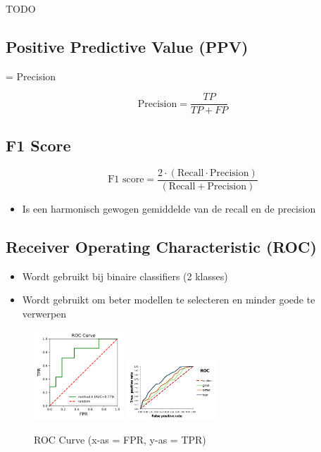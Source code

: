 \documentclass{article}
\begin{document}
TODO

\subsection{Positive Predictive Value (PPV)}

= Precision

\begin{equation}
    \text{Precision} = \frac{TP}{TP + FP}
\end{equation}

\subsection{F1 Score}

\begin{equation}
    \text{F1 score} = \frac{2\cdot(\text{Recall} \cdot \text{Precision})}{(\text{Recall} + \text{Precision})}
\end{equation}

\begin{itemize}
    \item Is een harmonisch gewogen gemiddelde van de recall en de precision
\end{itemize}

\subsection{Receiver Operating Characteristic (ROC)}

\begin{itemize}
    \item Wordt gebruikt bij binaire classifiers (2 klasses)
    \item Wordt gebruikt om beter modellen te selecteren en minder goede te verwerpen
\end{itemize}

\begin{figure}[H]
    \centering
    \includegraphics[width=0.3\textwidth]{roc.png}
    \includegraphics[width=0.3\textwidth]{roc2.png}
    \caption{ROC Curve (x-as = FPR, y-as = TPR)}
\end{figure}
\end{document}
